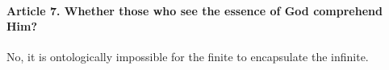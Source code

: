 \documentclass{ucetd}
\begin{document}
\paragraph{Article 7. Whether those who see the essence of God comprehend Him?}
No, it is ontologically impossible for the finite to encapsulate the infinite.
\end{document}
